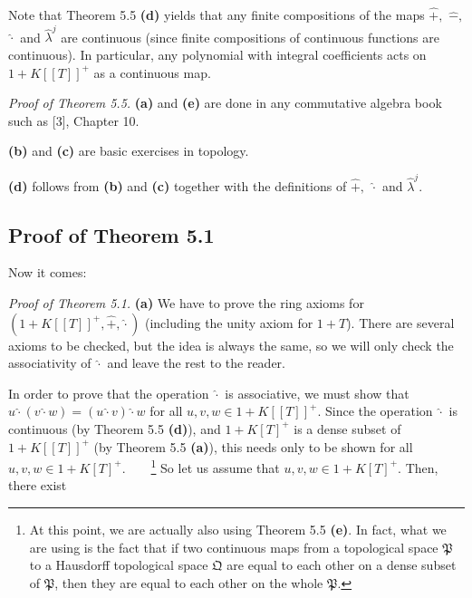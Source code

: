 \documentclass[numbers=enddot,12pt,final,onecolumn,notitlepage]{scrartcl}%
\begin{document}
Note that Theorem 5.5 \textbf{(d)} yields that any finite compositions of the
maps $\widehat{+},$ $\widehat{-},$ $\widehat{\cdot}$ and $\widehat{\lambda
}^{j}$ are continuous (since finite compositions of continuous functions are
continuous). In particular, any polynomial with integral coefficients acts on
$1+K\left[  \left[  T\right]  \right]  ^{+}$ as a continuous map.

\textit{Proof of Theorem 5.5.} \textbf{(a)} and \textbf{(e)} are done in any
commutative algebra book such as [3], Chapter 10.

\textbf{(b)} and \textbf{(c)} are basic exercises in topology.

\textbf{(d)} follows from \textbf{(b)} and \textbf{(c)} together with the
definitions of $\widehat{+},$ $\widehat{\cdot}$ and $\widehat{\lambda}^{j}$.

\subsection{Proof of Theorem 5.1}

Now it comes:

\textit{Proof of Theorem 5.1.} \textbf{(a)} We have to prove the ring axioms
for $\left(  1+K\left[  \left[  T\right]  \right]  ^{+},\widehat{+}%
,\widehat{\cdot}\right)  $ (including the unity axiom for $1+T$). There are
several axioms to be checked, but the idea is always the same, so we will only
check the associativity of $\widehat{\cdot}$ and leave the rest to the reader.

In order to prove that the operation $\widehat{\cdot}$ is associative, we must
show that $u\widehat{\cdot}\left(  v\widehat{\cdot}w\right)  =\left(
u\widehat{\cdot}v\right)  \widehat{\cdot}w$ for all $u,v,w\in1+K\left[
\left[  T\right]  \right]  ^{+}$. Since the operation $\widehat{\cdot}$ is
continuous (by Theorem 5.5 \textbf{(d)}), and $1+K\left[  T\right]  ^{+}$ is a
dense subset of $1+K\left[  \left[  T\right]  \right]  ^{+}$ (by Theorem 5.5
\textbf{(a)}), this needs only to be shown for all $u,v,w\in1+K\left[
T\right]  ^{+}$.\ \ \ \ \footnote{At this point, we are actually also using
Theorem 5.5 \textbf{(e)}. In fact, what we are using is the fact that if two
continuous maps from a topological space $\mathfrak{P}$ to a Hausdorff
topological space $\mathfrak{Q}$ are equal to each other on a dense subset of
$\mathfrak{P}$, then they are equal to each other on the whole $\mathfrak{P}%
$.} So let us assume that $u,v,w\in1+K\left[  T\right]  ^{+}$. Then, there exist
\end{document}

